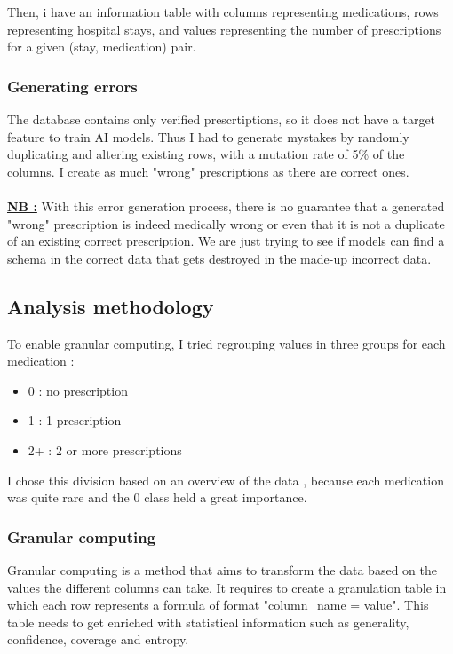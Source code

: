 \documentclass[a4paper,12pt]{article}
\begin{document}
Then, i have an information table with columns representing medications, rows representing hospital stays, and values representing the number of prescriptions for a given (stay, medication) pair.

\subsubsection{Generating errors}
The database contains only verified prescrtiptions, so it does not have a target feature to train AI models. Thus I had to generate mystakes by randomly duplicating and altering existing rows, with a mutation rate of 5\% of the columns. I create as much "wrong" prescriptions as there are correct ones.
\\
\\
\textbf{\underline{NB :} } With this error generation process, there is no guarantee that a generated "wrong" prescription is indeed medically wrong or even that it is not a duplicate of an existing correct prescription. We are just trying to see if models can find a schema in the correct data that gets destroyed in the made-up incorrect data.


\subsection{Analysis methodology}

To enable granular computing, I tried regrouping values in three groups for each medication : 
\begin{itemize}
    \item 0 : no prescription
    \item 1 : 1 prescription
    \item 2+ : 2 or more prescriptions
\end{itemize}
I chose this division based on an overview of the data , because each medication was quite rare and the 0 class held a great importance.

\subsubsection{Granular computing}

Granular computing is a method that aims to transform the data based on the values the different columns can take.
It requires to create a granulation table in which each row represents a formula of format "column\_name = value". 
This table needs to get enriched with statistical information such as generality, confidence, coverage and entropy. \cite{Jairi2024}
\end{document}
